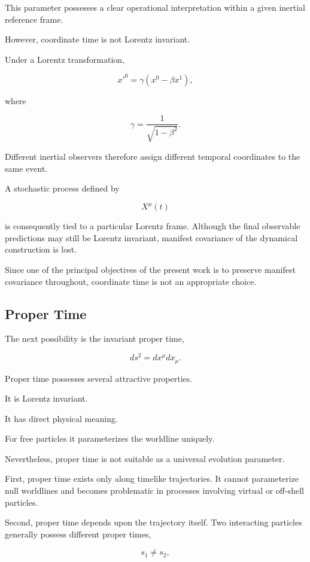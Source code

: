 This parameter possesses a clear operational interpretation within a
given inertial reference frame.

However, coordinate time is not Lorentz invariant.

Under a Lorentz transformation,

\[
x'^0
=
\gamma
\left(
x^0
-
\beta x^1
\right),
\]

where

\[
\gamma
=
\frac{1}{\sqrt{1-\beta^2}}.
\]

Different inertial observers therefore assign different temporal
coordinates to the same event.

A stochastic process defined by

\[
X^\mu(t)
\]

is consequently tied to a particular Lorentz frame. Although the final
observable predictions may still be Lorentz invariant, manifest
covariance of the dynamical construction is lost.

Since one of the principal objectives of the present work is to preserve
manifest covariance throughout, coordinate time is not an appropriate
choice.

\subsection{Proper Time}

The next possibility is the invariant proper time,

\[
ds^2
=
dx^\mu dx_\mu.
\]

Proper time possesses several attractive properties.

It is Lorentz invariant.

It has direct physical meaning.

For free particles it parameterizes the worldline uniquely.

Nevertheless, proper time is not suitable as a universal evolution
parameter.

First, proper time exists only along timelike trajectories. It cannot
parameterize null worldlines and becomes problematic in processes
involving virtual or off-shell particles.

Second, proper time depends upon the trajectory itself. Two interacting
particles generally possess different proper times,

\[
s_1
\neq
s_2,
\]


